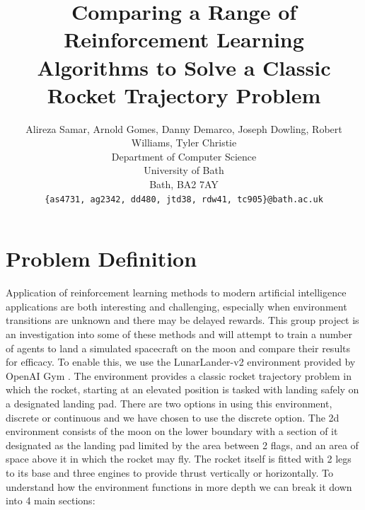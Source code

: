 \documentclass{article}
\title{Comparing a Range of Reinforcement Learning Algorithms to Solve a Classic Rocket Trajectory Problem}
\author{
  Alireza Samar, Arnold Gomes, Danny Demarco, Joseph Dowling, Robert Williams, Tyler Christie
  \\
  Department of Computer Science\\
  University of Bath\\
  Bath, BA2 7AY \\
  \texttt{\{as4731, ag2342, dd480, jtd38, rdw41, tc905\}@bath.ac.uk} \\
}
\begin{document}
\maketitle
\section{Problem Definition}
Application of reinforcement learning methods to modern artificial intelligence applications are both interesting and challenging, especially when environment transitions are unknown and there may be delayed rewards. This group project is an investigation into some of these methods and will attempt to train a number of agents to land a simulated spacecraft on the moon and compare their results for efficacy. To enable this, we use the LunarLander-v2 environment provided by OpenAI Gym \citep{1606.01540}. The environment provides a classic rocket trajectory problem in which the rocket, starting at an elevated position is tasked with landing safely on a designated landing pad. There are two options in using this environment, discrete or continuous and we have chosen to use the discrete option. The 2d environment consists of the moon on the lower boundary with a section of it designated as the landing pad limited by the area between 2 flags, and an area of space above it in which the rocket may fly. The rocket itself is fitted with 2 legs to its base and three engines to provide thrust vertically or horizontally. To understand how the environment functions in more depth we can break it down into 4 main sections:
\end{document}
